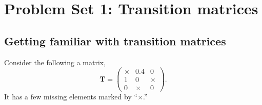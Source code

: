 \documentclass[12pt]{article}
\begin{document}
\section{Problem Set 1: Transition matrices}

\subsection{Getting familiar with transition matrices}


Consider the following a matrix,
\begin{equation}
  \mathbf T
  =
  \left(
    \begin{array}{ccc}
    \times  &   0.4   &   0       \\
    1       &   0     &   \times  \\
    0       & \times  &   0
    \end{array}
  \right)
  .
\end{equation}
It has a few missing elements marked by ``$\times$.''
\end{document}
